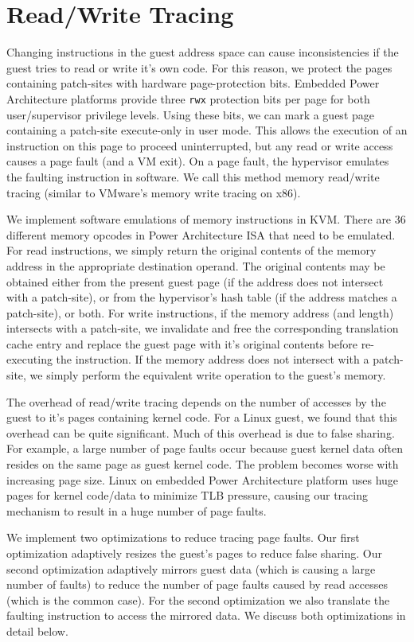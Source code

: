 \documentclass[10pt,twocolumn]{article}
\begin{document}
\section{Read/Write Tracing}
\label{sec:tracing}
Changing instructions in the guest address space can cause
inconsistencies if the guest tries to read or write it's own code.
For this reason, we protect the pages containing patch-sites with hardware
page-protection bits. Embedded Power Architecture platforms provide three {\tt rwx}
protection bits per page for both user/supervisor privilege levels. Using these
bits, we can mark a guest page containing a patch-site
execute-only in user mode. This allows the
execution of an instruction on this page to proceed uninterrupted,
but any read or write access causes a page fault (and a VM exit).
On a page fault, the hypervisor
emulates the faulting instruction in software. We call this
method memory read/write tracing (similar to VMware's memory write tracing
on x86\cite{adams:asplos06}).

We implement software emulations of memory instructions in KVM. There are 36
different memory opcodes in Power Architecture ISA that need to be emulated.
For read instructions, we simply return the original contents of the memory
address in the appropriate destination
operand. The original contents may be obtained either from the present guest
page (if the address does not intersect with a patch-site), or from the hypervisor's
hash table (if the address matches a patch-site), or both.
For write instructions, if the memory address (and length) intersects with a patch-site,
we invalidate and free the corresponding translation cache
entry and replace the guest page with it's original contents before
re-executing the instruction. If the memory address does not intersect with a
patch-site, we simply perform the equivalent write operation to the guest's memory.

The overhead of read/write tracing depends on the number of accesses by the guest
to it's pages containing kernel code. For a Linux guest, we found that this overhead
can be quite significant.
Much of this overhead is due to false sharing. For example, a large number of page
faults occur because guest kernel data often resides on the same page as
guest kernel code. The problem becomes worse with increasing page size. Linux
on embedded
Power Architecture platform uses huge pages for kernel code/data to minimize
TLB pressure, causing our tracing mechanism to result in a huge number of page
faults.

We implement two optimizations to reduce tracing page faults. Our first optimization
adaptively resizes the guest's pages to reduce false sharing.
Our second optimization adaptively
mirrors guest data (which is causing a large number of faults) to reduce the number
of page faults caused by read accesses (which is the common case). For the second
optimization we also translate the faulting instruction to access the mirrored data.
We discuss both optimizations in detail below.
\end{document}
